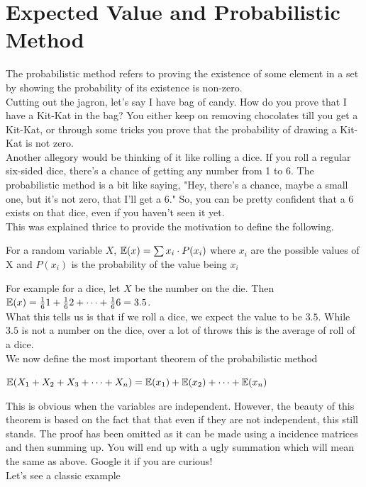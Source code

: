 \section{Expected Value and Probabilistic Method}
The probabilistic method refers to proving the existence of some element in a set by showing the probability of its existence is non-zero.\\
Cutting out the jagron, let's say I have bag of candy. How do you prove that I have a Kit-Kat in the bag? You either keep on removing chocolates till you get a Kit-Kat, or through some tricks you prove that the probability of drawing a Kit-Kat is not zero.\\
Another allegory would be thinking of it like rolling a dice. If you roll a regular six-sided dice, there's a chance of getting any number from 1 to 6. The probabilistic method is a bit like saying, "Hey, there's a chance, maybe a small one, but it's not zero, that I'll get a 6." So, you can be pretty confident that a 6 exists on that dice, even if you haven't seen it yet.\\
This was explained thrice to provide the motivation to define the following.
\begin{definition}
For a random variable $X$,  $\mathbb{E}({x})=\sum {x_i \cdot P(x_i)}$ where $x_i$ are the possible values of X and $P(x_i)$ is the probability of the value being $x_i$
\end{definition}
For example for a dice, let $X$ be the number on the die. Then $\mathbb{E}({x})=\frac{1}{6}1+\frac{1}{6}2+\dots+\frac{1}{6}6 =3.5$.\\
What this tells us is that if we roll a dice, we expect the value to be $3.5$. While $3.5$ is not a number on the dice, over a lot of throws this is the average of roll of a dice.\\
We now define the most important theorem of the probabilistic method
\begin{theorem}
 $\mathbb{E}({X_1+X_2+X_3+\dots +X_n})=\mathbb{E}({x_1})+\mathbb{E}({x_2})+\dots +\mathbb{E}({x_n})$\\
\end{theorem}
This is obvious when the variables are independent. However, the beauty of this theorem is based on the fact that that even if they are not independent, this still stands. The proof has been omitted as it can be made using a incidence matrices and then summing up. You will end up with a ugly summation which will mean the same as above. Google it if you are curious!\\
Let's see a classic example\\
